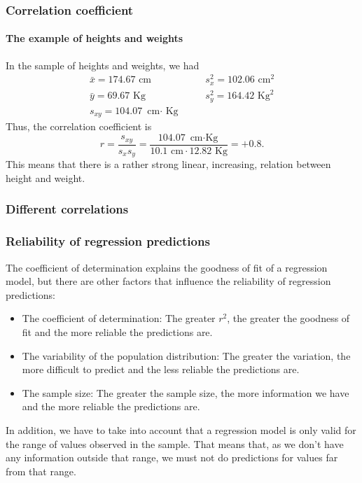 \begin{frame}
\frametitle{Correlation coefficient}
\framesubtitle{The example of heights and weights}
In the sample of heights and weights, we had
\[
\begin{array}{lll}
\bar x = 174.67 \mbox{ cm} & \quad & s^2_x = 102.06 \mbox{ cm}^2\\
\bar y = 69.67 \mbox{ Kg} & & s^2_y = 164.42 \mbox{ Kg}^2\\
s_{xy} = 104.07 \mbox{ cm$\cdot$ Kg}
\end{array}
\]
Thus, the correlation coefficient is 
\[
r = \frac{s_{xy}}{s_xs_y} = \frac{104.07 \mbox{ cm$\cdot$Kg}}{10.1 \mbox{ cm} \cdot 12.82 \mbox{ Kg}} = +0.8.
\]
This means that there is a rather strong linear, increasing, relation between height and weight.
\end{frame}


\begin{frame}
\frametitle{Different correlations}
\centering
{}
\resizebox{\textwidth}{!}{}
\end{frame}


\begin{frame}
\frametitle{Reliability of regression predictions}
The coefficient of determination explains the goodness of fit of a regression model, but there are other factors that influence the reliability of regression predictions:

\begin{itemize}
\item The coefficient of determination: The greater $r^2$, the greater the goodness of fit and the more reliable the predictions are.
\item The variability of the population distribution: The greater the variation, the more difficult to predict and the less reliable the predictions are.
\item The sample size: The greater the sample size, the more information we have and the more reliable the
predictions are. 
\end{itemize}

In addition, we have to take into account that a regression model is only valid for the range of values observed in the sample. 
That means that, as we don't have any information outside that range, we must not do predictions for values far from that range.
\end{frame}


